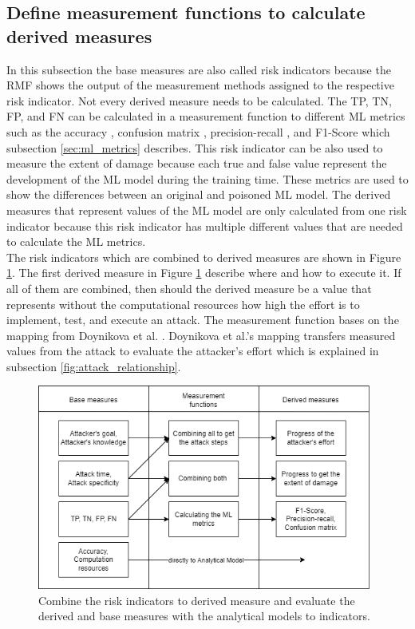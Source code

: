 \subsection{Define measurement functions to calculate derived measures}
\label{sec:derived_measures}

In this subsection the base measures are also called risk indicators because the RMF shows the output of the measurement methods assigned to the respective risk indicator. Not every derived measure needs to be calculated. The TP, TN, FP, and FN can be calculated in a measurement function to different ML metrics such as the accuracy \cite{9783960101925}, confusion matrix \cite{DBLP:journals/isci/XuZM20}, precision-recall \cite{DBLP:conf/icml/DavisG06}, and F1-Score
\cite{9783960101925} which subsection \ref{sec:ml_metrics} describes. This risk indicator can be also used to measure the extent of damage because each true and false value represent the development of the ML model during the training time. These metrics are used to show the differences between an original and poisoned ML model. The derived measures that represent values of the ML model are only calculated from one risk indicator because this risk indicator has multiple different values that are needed to calculate the ML metrics. \\
The risk indicators which are combined to derived measures are shown in Figure \ref{fig:measurement_steps}. The first derived measure in Figure \ref{fig:measurement_steps} describe where and how to execute it. If all of them are combined, then should the derived measure be a value that represents without the computational resources how high the effort is to implement, test, and execute an attack. The measurement function bases on the mapping from Doynikova et al. \cite{DBLP:conf/crisis/DoynikovaNGK20}. Doynikova et al.'s mapping transfers measured values from the attack to evaluate the attacker's effort which is explained in subsection \ref{fig:attack_relationship}.

\begin{figure}[ht!]
  \centering
  \includegraphics[width=11cm]{pictures/derived_measures.png}
  \caption{Combine the risk indicators to derived measure and evaluate the derived and base measures with the analytical models to indicators.}
  \label{fig:measurement_steps}
\end{figure}


